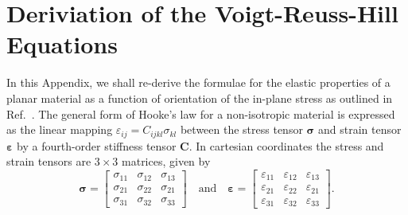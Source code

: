 
\section[Deriviation of the Voigt-Reuss-Hill Equations]{Deriviation of the Voigt-Reuss-Hill \break Equations}
\label{sec:vrh_derivation}

In this Appendix, we shall re-derive 
the formulae 
for the elastic properties 
of a planar material
 as a function 
of orientation of the in-plane stress 
as outlined in Ref.~\cite{jones1975mechanics}.
%
The general form of Hooke's law for a non-isotropic material 
is expressed as the linear mapping 
$\varepsilon_{ij}=C_{ijkl}\sigma_{kl}$ 
between the stress tensor $\boldsymbol{\sigma}$ 
and strain tensor $\boldsymbol{\varepsilon}$ 
by a fourth-order stiffness tensor $\boldsymbol{C}$.
%
In cartesian coordinates the stress and strain 
tensors are $3\times3$ matrices, given by 
%
\begin{equation}
\boldsymbol{\sigma}=\left[\begin{array}{ccc}
\sigma_{11} & \sigma_{12} & \sigma_{13} \\
\sigma_{21} & \sigma_{22} & \sigma_{21} \\
\sigma_{31} & \sigma_{32} & \sigma_{33} 
\end{array}
\right]
\quad
\mbox{and}
\quad
\boldsymbol{\varepsilon}=\left[\begin{array}{ccc}
\varepsilon_{11} & \varepsilon_{12} & \varepsilon_{13} \\
\varepsilon_{21} & \varepsilon_{22} & \varepsilon_{21} \\
\varepsilon_{31} & \varepsilon_{32} & \varepsilon_{33} 
\end{array}
\right].
\end{equation}

